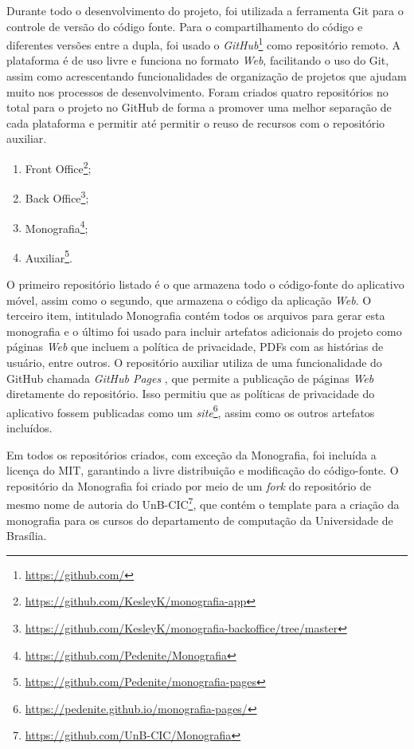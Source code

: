 Durante todo o desenvolvimento do projeto, foi utilizada a ferramenta Git para o controle de versão do código fonte. Para o compartilhamento do código e diferentes versões entre a dupla, foi usado o \textit{GitHub}\footnote{\url{https://github.com/}} como repositório remoto. A plataforma é de uso livre e funciona no formato \textit{Web}, facilitando o uso do Git, assim como acrescentando funcionalidades de organização de projetos que ajudam muito nos processos de desenvolvimento. Foram criados quatro repositórios no total para o projeto no GitHub de forma a promover uma melhor separação de cada plataforma e permitir até permitir o reuso de recursos com o repositório auxiliar.

\begin{enumerate}
    \item Front Office\footnote{\url{https://github.com/KesleyK/monografia-app}};
    \item Back Office\footnote{\url{https://github.com/KesleyK/monografia-backoffice/tree/master}};
    \item Monografia\footnote{\url{https://github.com/Pedenite/Monografia}};
    \item Auxiliar\footnote{\url{https://github.com/Pedenite/monografia-pages}}.
\end{enumerate}

O primeiro repositório listado é o que armazena todo o código-fonte do aplicativo móvel, assim como o segundo, que armazena o código da aplicação \textit{Web}. O terceiro item, intitulado Monografia contém todos os arquivos para gerar esta monografia e o último foi usado para incluir artefatos adicionais do projeto como páginas \textit{Web} que incluem a política de privacidade, PDFs com as histórias de usuário, entre outros. O repositório auxiliar utiliza de uma funcionalidade do GitHub chamada \textit{GitHub Pages} \cite{github-pages}, que permite a publicação de páginas \textit{Web} diretamente do repositório. Isso permitiu que as políticas de privacidade do aplicativo fossem publicadas como um \textit{site}\footnote{\url{https://pedenite.github.io/monografia-pages/}}, assim como os outros artefatos incluídos.

Em todos os repositórios criados, com exceção da Monografia, foi incluída a licença do MIT, garantindo a livre distribuição e modificação do código-fonte. O repositório da Monografia foi criado por meio de um \textit{fork} do repositório de mesmo nome de autoria do UnB-CIC\footnote{\url{https://github.com/UnB-CIC/Monografia}}, que contém o template para a criação da monografia para os cursos do departamento de computação da Universidade de Brasília. 

